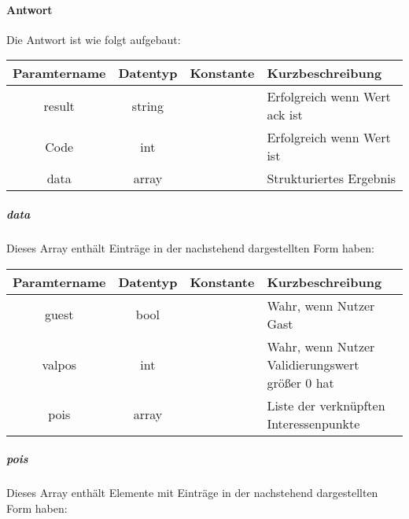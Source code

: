 \paragraph{Antwort}Die Antwort ist wie folgt aufgebaut:
\begin{table}[H]
	\begin{tabular}{|c|c|c|p{6.5cm}|}
		\hline
		\textbf{Paramtername} & \textbf{Datentyp} & \textbf{Konstante} & \textbf{Kurzbeschreibung}                                                                                               \\ \hline
		result              & string           &                 & Erfolgreich wenn Wert {\glqq ack\grqq} ist \\ \hline
		Code                & int              &                 & Erfolgreich wenn Wert {\glqq 0\grqq} ist \\ \hline
		data                & array            &                 & Strukturiertes Ergebnis \\ \hline
	\end{tabular}
\end{table}
\subparagraph{data}Dieses Array enthält Einträge in der nachstehend dargestellten Form haben:
\begin{table}[H]
	\begin{tabular}{|c|c|c|p{6.5cm}|}
		\hline
		\textbf{Paramtername} & \textbf{Datentyp} & \textbf{Konstante} & \textbf{Kurzbeschreibung}    \\ \hline
		guest                  & bool            &                 & Wahr, wenn Nutzer Gast \\ \hline
		valpos                 & int             &                 & Wahr, wenn Nutzer Validierungswert größer 0 hat \\ \hline
		pois                   & array           &                 & Liste der verknüpften Interessenpunkte \\ \hline
	\end{tabular}
\end{table}
\subparagraph{pois}Dieses Array enthält Elemente mit Einträge in der nachstehend dargestellten Form haben:
